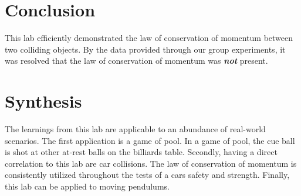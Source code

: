 \documentclass{article}
\begin{document}
\section*{Conclusion}
This lab efficiently demonstrated the law of conservation of momentum between two colliding objects.
By the data provided through our group experiments, it was resolved that the law of
conservation of momentum was \textbf{\textit{not}} present.
\newline

\section*{Synthesis}
The learnings from this lab are applicable to an abundance of real-world scenarios.
The first application is a game of pool. In a game of pool, the cue ball is shot at other at-rest balls on the billiards table.
Secondly, having a direct correlation to this lab are car collisions. The law of conservation of momentum is consistently utilized
throughout the tests of a cars safety and strength. Finally, this lab can be applied to moving pendulums.
\end{document}
